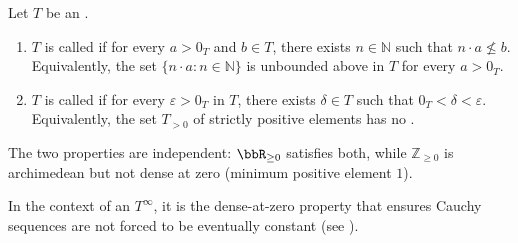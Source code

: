 \begin{definition} \label{definition:archimedean_ordered_semiring_dense_at_zero_ordered_semiring}
    Let $T$ be an .

    \begin{enumerate}
        \item $T$ is called  if for every $a > 0_T$ and $b \in T$, there exists $n \in \mathbb{N}$ such that $n \cdot a \not\le b$. Equivalently, the set $\{n \cdot a : n \in \mathbb{N}\}$ is unbounded above in $T$ for every $a > 0_T$.

        \item $T$ is called  if for every $\varepsilon > 0_T$ in $T$, there exists $\delta \in T$ such that $0_T < \delta < \varepsilon$. Equivalently, the set $T_{>0}$ of strictly positive elements has no .
    \end{enumerate}

    The two properties are independent: $\bbR_{\geq 0}$ satisfies both, while $\mathbb{Z}_{\geq 0}$ is archimedean but not dense at zero (minimum positive element $1$).

    In the context of  an  $T^\infty$, it is the dense-at-zero property that ensures Cauchy sequences are not forced to be eventually constant (see ).
\end{definition}
